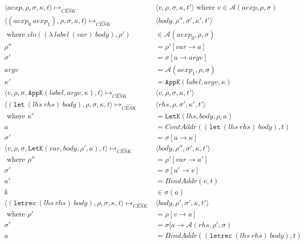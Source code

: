 \documentclass[paper=a4, fontsize=11pt]{scrartcl} %
\numberwithin{equation}{section} %
\numberwithin{figure}{section} %
\numberwithin{table}{section} %
\begin{document}
\begin{figure}[h!]
\begin{align*}
\langle aexp, \rho, \sigma, \kappa, t \rangle \longmapsto_{\widehat{CESK}} & \langle v, \rho, \sigma, \kappa, t' \rangle \text{ where } v \in \mathcal{A}(aexp, \rho, \sigma) \\
\langle (aexp_0~aexp_1), \rho, \sigma, \kappa, t \rangle \longmapsto_{\widehat{CESK}} & \langle body, \rho'', \sigma', \kappa', t' \rangle \\
\text{ where } clo((\lambda~label~(var)~body), \rho') & \in \mathcal{A}(aexp_0, \rho, \sigma) \\
\rho'' & = \rho'[var \rightarrow a] \\
\sigma' & = \sigma[a \rightarrow argv] \\
argv & = \mathcal{A}(aexp_1, \rho, \sigma) \\
\kappa' & = \texttt{AppK}(label, argv, \kappa) \\
\langle v, \rho, \sigma, \texttt{AppK}(label, argv, \kappa), t \rangle \longmapsto_{\widehat{CESK}} & \langle v, \rho, \sigma, \kappa, t' \rangle \\
\langle (\texttt{let}~(lhs~rhs)~body), \rho, \sigma, \kappa, t \rangle \longmapsto_{\widehat{CESK}} & \langle rhs, \rho, \sigma', \kappa', t' \rangle \\
\text{ where } \kappa' & = \texttt{LetK}(lhs, body, \rho, a) \\
a & = ContAddr((\texttt{let}~(lhs~rhs)~body), t) \\
\sigma' & = \sigma[a \rightarrow \kappa] \\
\langle v, \rho, \sigma, \texttt{LetK}(var, body, \rho', a), t \rangle \longmapsto_{\widehat{CESK}} & \langle body, \rho'', \sigma', \kappa, t' \rangle  \\
\text{ where } \rho'' & = \rho'[var \rightarrow a'] \\
\sigma' & = \sigma[a' \rightarrow v] \\
a' & = BindAddr(v, t) \\
k & \in \sigma(a) \\
\langle (\texttt{letrec}~(lhs~rhs)~body), \rho, \sigma, \kappa, t \rangle \longmapsto_{\widehat{CESK}} & \langle body, \rho', \sigma', \kappa, t' \rangle \\
\text{ where } \rho' & = \rho[v \rightarrow a] \\
\sigma' & = \sigma[a \rightarrow \mathcal{A}(rhs, \rho', \sigma) \\
a & = BindAddr((\texttt{letrec}~(lhs~rhs)~body), t) \\

\end{align*}
\end{figure}
\end{document}

